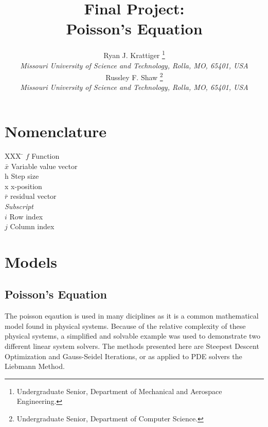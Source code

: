 \documentclass[]{aiaa-tc}%
\title{Final Project: \\ Poisson's Equation}
\author{
  Ryan J. Krattiger%
    \thanks{Undergraduate Senior, Department of Mechanical and Aerospace Engineering.} \\
  {\normalsize\itshape
  Missouri University of Science and Technology, Rolla, MO, 65401, USA} \\
  Russley F. Shaw%
    \thanks{Undergraduate Senior, Department of Computer Science.} \\
  {\normalsize\itshape
  Missouri University of Science and Technology, Rolla, MO, 65401, USA}
 }
\begin{document}
\maketitle

\begin{abstract}

\end{abstract}

\newpage

\tableofcontents

\lstlistoflistings

\newpage

\section*{Nomenclature}

\begin{tabbing}
  XXX \= \kill%
  $f$ \> Function \\
  $\bar x$ \> Variable value vector \\
  h \> Step size \\
  x \> x-position \\
  $\bar r$ \> residual vector \\
  \textit{Subscript} \\
  $i$ \> Row index \\
  $j$ \> Column index \\
 \end{tabbing}

\FloatBarrier\section{Models}

\FloatBarrier\subsection{Poisson's Equation}

The poisson eqaution is used in many diciplines as it is a common mathematical
model found in physical systems. Because of the relative complexity of these
physical systems, a simplified and solvable example was used to demonstrate 
two different linear system solvers. The methods presented here are 
Steepest Descent Optimization and Gauss-Seidel Iterations, or as applied to PDE
solvers the Liebmann Method.
\end{document}
